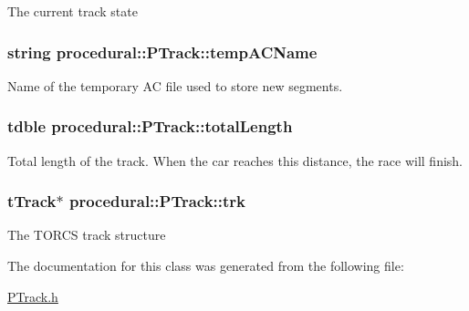 The current track state \hypertarget{classprocedural_1_1_p_track_a94cc721755160a6ba8ff51471507616c}{
\subsubsection[{temp\-A\-C\-Name}]{\setlength{\rightskip}{0pt plus 5cm}string procedural\-::\-P\-Track\-::temp\-A\-C\-Name\hspace{0.3cm}{\ttfamily [private]}}}\label{classprocedural_1_1_p_track_a94cc721755160a6ba8ff51471507616c}
Name of the temporary A\-C file used to store new segments. \hypertarget{classprocedural_1_1_p_track_a5b2eda49220f8825f55624faf62aa106}{
\subsubsection[{total\-Length}]{\setlength{\rightskip}{0pt plus 5cm}tdble procedural\-::\-P\-Track\-::total\-Length\hspace{0.3cm}{\ttfamily [private]}}}\label{classprocedural_1_1_p_track_a5b2eda49220f8825f55624faf62aa106}
Total length of the track. When the car reaches this distance, the race will finish. \hypertarget{classprocedural_1_1_p_track_a7ff84df3ba51a2f6896160ead70e91f7}{
\subsubsection[{trk}]{\setlength{\rightskip}{0pt plus 5cm}t\-Track$\ast$ procedural\-::\-P\-Track\-::trk}}\label{classprocedural_1_1_p_track_a7ff84df3ba51a2f6896160ead70e91f7}
The T\-O\-R\-C\-S track structure 

The documentation for this class was generated from the following file\-:\begin{DoxyCompactItemize}
\item 
\hyperlink{_p_track_8h}{P\-Track.\-h}\end{DoxyCompactItemize}

